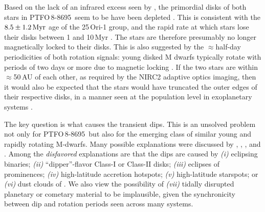 \documentclass[12pt,twocolumn,tighten]{aastex62}
\newcommand{\ptfo}{PTFO$\,$8-8695}
\begin{document}
Based on the lack of an infrared excess seen by \citet{yu_tests_2015},
the primordial  disks of both stars in \ptfo\ seem to be
have been depleted .
This is consistent with the $8.5\pm1.2\,{\rm Myr}$ age of the
25$\,$Ori-1 group, and the rapid rate at which stars 
lose their disks between 1 and 10$\,$Myr \citep[{\it
e.g.},][]{hernandez_spitzer_ob1_2007}.  The stars are therefore
presumably no longer magnetically locked to their disks.  This is also
suggested by the $\approx$half-day periodicities of both rotation
signals: young disked M dwarfs typically rotate with periods of two
days or more due to magnetic locking \citep[{\it
e.g.},][]{rebull_rotation_2020}.  If the two stars are within
$\approx$50$\,$AU of each other, as required by the NIRC2 adaptive
optics imaging, then it would also be expected that the stars would
have truncated the outer edges of their respective disks, in a manner
seen at the population level in exoplanetary systems
\citep{kraus_impact_2016,moe_impact_2019}.

The key question is what causes the transient dips. This is an
unsolved problem not only for \ptfo\ but also for the emerging class
of similar young and rapidly rotating M-dwarfs.  Many possible
explanations were discussed by \citet{rebull_rotation_2016},
\citet{david_transient_2017}, \citet{stauffer_orbiting_2017}, and
\citet{zhan_complex_2019}.  Among the {\it disfavored} explanations
are that the dips are caused by
{\it (i)} eclipsing binaries;
{\it (ii)} ``dipper''-flavor Class-I or Class-II disks;
{\it (iii)} eclipses of prominences;
{\it (iv)} high-latitude accretion hotspots;
{\it (v)} high-latitude starspots;
or {\it (vi)} dust clouds of .  We also view the possibility
of {\it (vii)} tidally disrupted planetary or cometary material to be
implausible, given the synchronicity between dip and rotation periods
seen across many systems.
\end{document}

